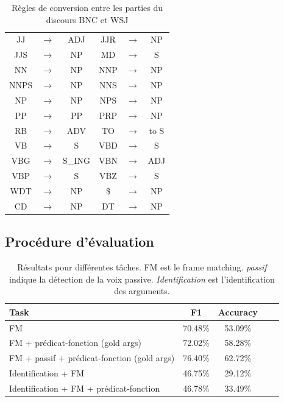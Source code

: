 \begin{table}[ht]
    \centering
    \begin{tabular}{ccc|ccc}
        \toprule
        JJ   &$\to$& ADJ    & JJR  &$\to$& NP     \\
        JJS  &$\to$& NP     & MD   &$\to$& S      \\
        NN   &$\to$& NP     & NNP  &$\to$& NP     \\
        NNPS &$\to$& NP     & NNS  &$\to$& NP     \\
        NP   &$\to$& NP     & NPS  &$\to$& NP     \\
        PP   &$\to$& PP     & PRP  &$\to$& NP     \\  
        RB   &$\to$& ADV    & TO   &$\to$& to S   \\
        VB   &$\to$& S      & VBD  &$\to$& S      \\
        VBG  &$\to$& S\_ING & VBN  &$\to$& ADJ    \\
        VBP  &$\to$& S      & VBZ  &$\to$& S      \\
        WDT  &$\to$& NP     & \$   &$\to$& NP     \\  
        CD   &$\to$& NP     & DT   &$\to$& NP     \\
        \bottomrule
    \end{tabular}
    \caption{\protect\centering\label{table:tagset_rules}Règles de conversion entre les parties du discours BNC et WSJ}
\end{table}


\subsection{Procédure d'évaluation}

\begin{table}[ht]
    \centering
    \begin{tabular}{lcccc}
        \toprule
        Task                                           & F1        & Accuracy \\
        \midrule
        FM                                             & 70.48\%   & 53.09\%  \\
        FM + prédicat-fonction (gold args)                & 72.02\%   & 58.28\%  \\
        FM + passif + prédicat-fonction (gold args)      & 76.40\%   & 62.72\%  \\
        \midrule
        Identification + FM                            & 46.75\%   & 29.12\%  \\
        Identification + FM + prédicat-fonction           & 46.78\%   & 33.49\%  \\
        \bottomrule
    \end{tabular}
    \caption{\protect\centering\label{table:results}Résultats pour différentes tâches. FM est le frame matching. \emph{passif} indique la détection de la voix passive. \emph{Identification} est l'identification des arguments.}
\end{table}

